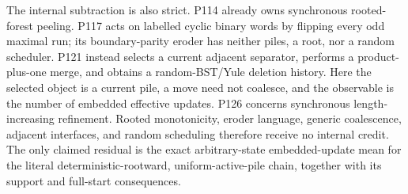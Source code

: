 The internal subtraction is also strict.  P114 already owns synchronous
rooted-forest peeling.  P117 acts on labelled cyclic binary words by flipping
every odd maximal run; its boundary-parity eroder has neither piles, a root,
nor a random scheduler.  P121 instead selects a current adjacent separator,
performs a product-plus-one merge, and obtains a random-BST/Yule deletion
history.  Here the selected object is a current pile, a move need not
coalesce, and the observable is the number of embedded effective updates.
P126 concerns synchronous length-increasing refinement.  Rooted
monotonicity, eroder language, generic coalescence, adjacent interfaces, and
random scheduling therefore receive no internal credit.  The only claimed
residual is the exact arbitrary-state embedded-update mean for the literal
deterministic-rootward, uniform-active-pile chain, together with its support
and full-start consequences.
